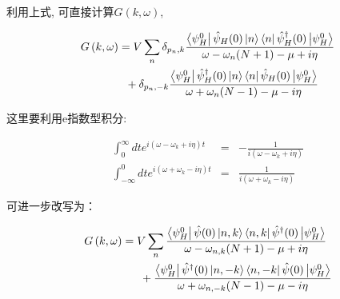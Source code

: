 利用上式, 可直接计算$G(k, \omega)$,


\[
\begin{gathered}
  G\left( {k,\omega } \right) = V\sum\limits_n {\delta _{p_n ,k} \frac{{\left\langle {\psi _H^0 } \right|\hat \psi _H (0)\left| n \right\rangle \left\langle n \right|\hat \psi _H^\dagger  (0)\left| {\psi _H^0 } \right\rangle }}
{{\omega  - \omega _n (N + 1) - \mu  + i\eta }}}  \hfill \\
  \begin{array}{*{20}c}
   {} & {}  \\

 \end{array} \begin{array}{*{20}c}
   {} & {}  \\

 \end{array}  + \delta _{p_n , - k} \frac{{\left\langle {\psi _H^0 } \right|\hat \psi _H^\dagger  (0)\left| n \right\rangle \left\langle n \right|\hat \psi _H (0)\left| {\psi _H^0 } \right\rangle }}
{{\omega  + \omega _n (N - 1) - \mu  - i\eta }} \hfill \\
\end{gathered}
\]


这里要利用e指数型积分:

\begin{eqnarray*}
  \int_0^\infty dt e^{i(\omega-\omega_k + i \eta)t} &=& - \frac{1}{i(\omega - \omega_k + i \eta)} \\
  \int_{-\infty}^0 dt e^{i (\omega + \omega_k - i \eta)t} &=& \frac{1}{i(\omega + \omega_k - i\eta)}
\end{eqnarray*}


可进一步改写为：

\[
\begin{gathered}
  G\left( {k,\omega } \right) = V\sum\limits_n {\frac{{\left\langle {\psi _H^0 } \right|\hat \psi (0)\left| {n,k} \right\rangle \left\langle {n,k} \right|\hat \psi ^\dagger  (0)\left| {\psi _H^0 } \right\rangle }}
{{\omega  - \omega _{n,k} (N + 1) - \mu  + i\eta }}}  \hfill \\
  \begin{array}{*{20}c}
   {\begin{array}{*{20}c}
   {} & {}  \\

 \end{array} } & {} & {}  \\

 \end{array}  + \frac{{\left\langle {\psi _H^0 } \right|\hat \psi ^\dagger  (0)\left| {n, - k} \right\rangle \left\langle {n, - k} \right|\hat \psi (0)\left| {\psi _H^0 } \right\rangle }}
{{\omega  + \omega _{n, - k} (N - 1) - \mu  - i\eta }} \hfill \\
\end{gathered}
\]


